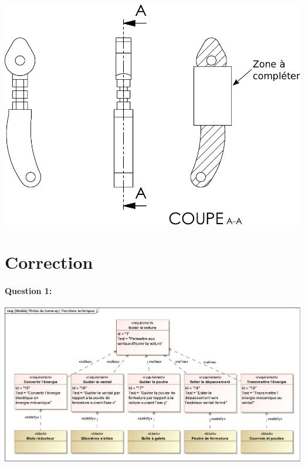 \newpage



\begin{center}
 \includegraphics[width=0.8\linewidth]{img/Piece}
\end{center}


\ifdef{\public}{}{}

\newpage
\cleardoublepage

\pagestyle{correction}

\section{Correction}

\paragraph{Question 1:}

\begin{center}
 \includegraphics[width=\linewidth]{img/fonctions_techniques_cor}
\end{center}

